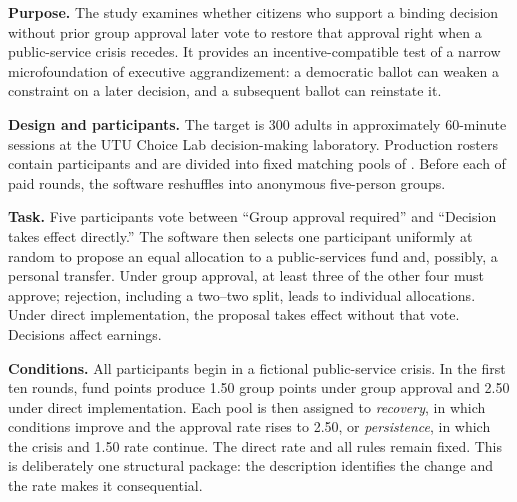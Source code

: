 


\small

\textbf{Purpose.} The study examines whether citizens who support a binding decision without prior group approval later vote to restore that approval right when a public-service crisis recedes. It provides an incentive-compatible test of a narrow microfoundation of executive aggrandizement: a democratic ballot can weaken a constraint on a later decision, and a subsequent ballot can reinstate it.

\textbf{Design and participants.} The target is 300 adults in approximately 60-minute sessions at the UTU Choice Lab decision-making laboratory. Production rosters contain  participants and are divided into fixed matching pools of . Before each of  paid rounds, the software reshuffles  into anonymous five-person groups. 

\textbf{Task.} Five participants vote between ``Group approval required'' and ``Decision takes effect directly.'' The software then selects one participant uniformly at random to propose an equal allocation to a public-services fund and, possibly, a personal transfer. Under group approval, at least three of the other four must approve; rejection, including a two--two split, leads to individual allocations. Under direct implementation, the proposal takes effect without that vote. Decisions affect earnings.

\textbf{Conditions.} All participants begin in a fictional public-service crisis. In the first ten rounds, fund points produce 1.50 group points under group approval and 2.50 under direct implementation. Each pool is then assigned to \emph{recovery}, in which conditions improve and the approval rate rises to 2.50, or \emph{persistence}, in which the crisis and 1.50 rate continue. The direct rate and all rules remain fixed. This is deliberately one structural package: the description identifies the change and the rate makes it consequential.

